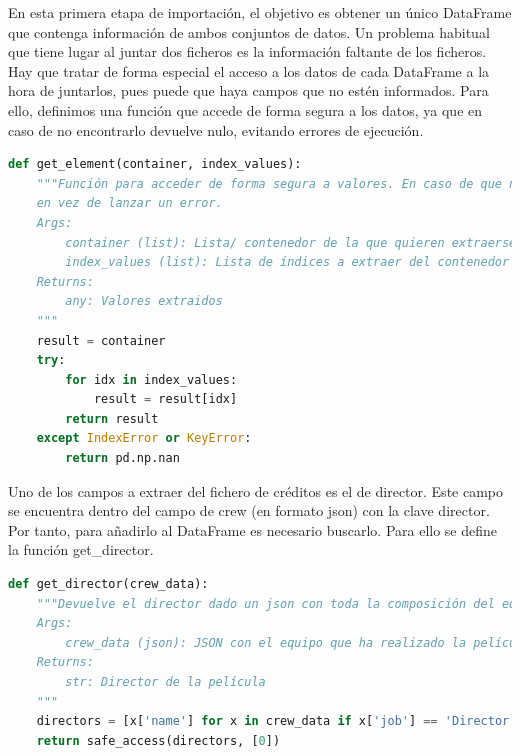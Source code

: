 En esta primera etapa de importación, el objetivo es obtener un único DataFrame que contenga información de ambos conjuntos de datos. Un problema habitual que tiene lugar al juntar dos ficheros es la información faltante de los ficheros. Hay que tratar de forma especial el acceso a los datos de cada DataFrame a la hora de juntarlos, pues puede que haya campos que no estén informados. Para ello, definimos una función que accede de forma segura a los datos, ya que en caso de no encontrarlo devuelve nulo, evitando errores de ejecución.

\begin{lstlisting}[language=Python, caption=Acceso a los datos de forma segura.]
def get_element(container, index_values):
    """Función para acceder de forma segura a valores. En caso de que no se encuentre uno de ellos, se devuelve NaN
    en vez de lanzar un error.
    Args:
        container (list): Lista/ contenedor de la que quieren extraerse los valores
        index_values (list): Lista de índices a extraer del contenedor
    Returns:
        any: Valores extraidos
    """
    result = container
    try:
        for idx in index_values:
            result = result[idx]
        return result
    except IndexError or KeyError:
        return pd.np.nan
\end{lstlisting}

Uno de los campos a extraer del fichero de créditos es el de director. Este campo se encuentra dentro del campo de crew (en formato json) con la clave director. Por tanto, para añadirlo al DataFrame es necesario buscarlo. Para ello se define la función get\_director.
\begin{lstlisting}[language=Python, caption= Obtención de una lista de directores extraidos del campo crew.]
def get_director(crew_data):
    """Devuelve el director dado un json con toda la composición del equipo de la película.
    Args:
        crew_data (json): JSON con el equipo que ha realizado la película
    Returns:
        str: Director de la película
    """
    directors = [x['name'] for x in crew_data if x['job'] == 'Director']
    return safe_access(directors, [0])
\end{lstlisting}

